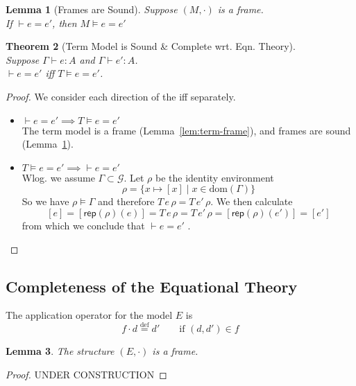 \documentclass{tufte-handout}
\newcommand{\defeq}[0]{\overset{\mathrm{def}}{=}}
\newtheorem{theorem}{Theorem}%
\newtheorem{lemma}[theorem]{Lemma}
\begin{document}
\begin{lemma}[Frames are Sound]
  \label{lem:frame-sound}
  Suppose $(M,\cdot)$ is a frame.\\
  If $\vdash e = e'$, then $M \models e = e'$
\end{lemma}


\begin{theorem}[Term Model is Sound \& Complete wrt. Eqn. Theory]\ \\
  Suppose $\Gamma \vdash e : A$ and $\Gamma \vdash e' : A$.\\
  $\vdash e = e'$ iff $T \models e = e'$.
\end{theorem}
\begin{proof}
  We consider each direction of the iff separately.
  \begin{itemize}
  \item $\vdash e = e' \implies T \models e = e'$ \\
    The term model is a frame (Lemma~\ref{lem:term-frame}),
    and frames are sound (Lemma~\ref{lem:frame-sound}).
  \item $T \models e = e' \implies \vdash e = e'$ \\
    Wlog. we assume $\Gamma \subset \mathcal{G}$.
    Let $\rho$ be the identity environment
    \[
    \rho = \{ x \mapsto [x] \mid x \in \mathrm{dom}(\Gamma) \}
    \]
    So we have $\rho \models \Gamma$
    and therefore $T\,e\,\rho = T\,e'\,\rho$. We then calculate
    \[
      [e]
      = [\mathsf{rep}(\rho)(e)]
      = T\,e\,\rho
      = T\,e'\,\rho
      = [\mathsf{rep}(\rho)(e')]
      = [e']
    \]
    from which we conclude that $\vdash e = e'$ .
    
  \end{itemize}
  
\end{proof}


\subsection{Completeness of the Equational Theory}


The application operator for the model $E$ is
\[
   f \cdot d \defeq d' \qquad \text{if } (d,d') \in f
\]

\begin{lemma}
\label{lem:E-frame}
The structure $(E,\cdot)$ is a frame.
\end{lemma}
\begin{proof}
  UNDER CONSTRUCTION
\end{proof}
\end{document}
